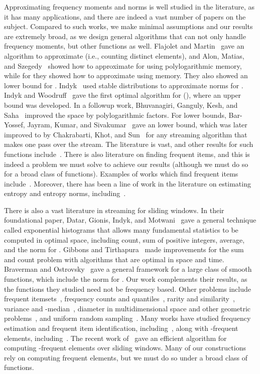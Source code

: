 \documentclass[11pt]{article}
\begin{document}
Approximating frequency moments and  norms is
well studied in the literature, as it has many applications,
and there are indeed a vast number of papers on the subject.  Compared to such works,
we make minimal assumptions and our results are extremely broad, as we design general algorithms that can not
only handle frequency moments, but other functions as well.
Flajolet and Martin~\cite{FM85} gave an algorithm to approximate 
(i.e., counting distinct elements),
and Alon, Matias, and Szegedy~\cite{AMS96} showed how to approximate  for
 using polylogarithmic memory, while for  they showed how to approximate
 using  memory.  They also showed an  lower bound for
.  Indyk~\cite{I06} used stable distributions to approximate  norms for
.  Indyk and Woodruff~\cite{IW05} gave the first optimal algorithm
for  (), where an  upper bound was developed.  In a
followup work, Bhuvanagiri, Ganguly, Kesh, and Saha~\cite{BGKS06} improved the space by
polylogarithmic factors.  For lower bounds, Bar-Yossef, Jayram, Kumar, and
Sivakumar~\cite{BJKS02} gave an  lower bound, which was
later improved to  by Chakrabarti, Khot, and Sun~\cite{CKS03} for any
streaming algorithm that makes one pass over the stream.  The literature is vast, and other
results for such functions
include~\cite{IW03,W04,BJKST02,CK04,CDIM03,FKSV99,G04,GC07,L09,KNW10Soda,KNW10Pods}.
There is also literature on finding frequent items, and this is indeed a problem we must solve
to achieve our results (although we must do so for a broad class of functions).
Examples of works which find frequent items include~\cite{CCF02,CH08,CM05ELS}.
Moreover, there has been a line of work in the literature
on estimating entropy and entropy norms, including~\cite{BG06,CBM06,CCM07,GMV06,HNO08,LSOXZ06}.

There is also a vast literature in streaming for sliding
windows.  In their foundational paper, Datar, Gionis, Indyk, and Motwani~\cite{DGIM02}
gave a general technique called exponential histograms that allows many fundamental
statistics to be computed in optimal space, including count, sum
of positive integers, average, and the  norm for .
Gibbons and Tirthapura~\cite{GT02} made improvements for the sum and count problem
with algorithms that are optimal in space and time.  Braverman and Ostrovsky~\cite{BO07}
gave a general framework for a large class of smooth functions, which include the  norm
for .  Our work complements their results, as
the functions they studied need not be frequency based.  Other problems include frequent itemsets~\cite{CWYM04}, frequency counts and
quantiles~\cite{AM04,LT06PODS}, rarity and similarity~\cite{DM02}, variance and -median~\cite{BDMO03},
diameter in multidimensional space and other geometric problems~\cite{FKZ05,CS04,AHV05}, and uniform
random sampling~\cite{BDM02}.  Many works have studied frequency estimation and frequent item identification,
including~\cite{GDDLM03,JQSYZ03,CM05TRANS}, along with -frequent elements,
including~\cite{HT08,ZG08,BAE07,HLT10,NL05}.  The recent work of~\cite{BGO13} gave an efficient
algorithm for computing -frequent elements over sliding windows.  Many of our constructions rely
on computing frequent elements, but we must do so under a broad class of functions.
\end{document}

